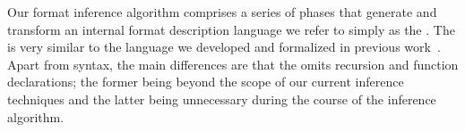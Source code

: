 Our format inference algorithm comprises a series of phases that
generate and transform an internal format description language we
refer to simply as the \ir.  The \ir{} is very similar to
the \ipads{} language we developed and formalized in previous 
work~\cite{fisher+:popl06}.  Apart from syntax, the main differences 
are that the \ir{} omits recursion and function declarations; the former
being beyond the scope of our current inference techniques and the 
latter being unnecessary during the course of the inference algorithm.


